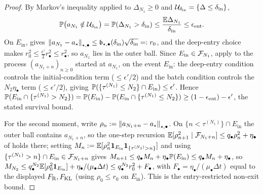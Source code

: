 \begin{proof}
By Markov's inequality applied to $\Delta_{N_1}\geq0$ and $\mathcal{U}_{\delta_{\mathrm{in}}}=\{\Delta\leq\delta_{\mathrm{in}}\}$,
\[
    \mathbb{P}\bigl(a_{N_1}\notin\mathcal{U}_{\delta_{\mathrm{in}}}\bigr)=\mathbb{P}(\Delta_{N_1}>\delta_{\mathrm{in}})
    \leq\frac{\mathbb{E}\Delta_{N_1}}{\delta_{\mathrm{in}}}\leq\epsilon_{\mathrm{ent}} .
\]
On $E_{\mathrm{in}}$,  gives
$\left\lVert a_{N_1}-a_\star\right\rVert_{\star,\bullet}\leq\mathfrak b_{\star,\bullet}(\delta_{\mathrm{in}})\sqrt{\delta_{\mathrm{in}}}=:r_0$,
and the deep-entry choice makes $r_0^2\leq\tfrac{\epsilon'}2r_\bullet^2\leq r_\bullet^2$, so
$a_{N_1}$ lies in the outer ball. Since
$E_{\mathrm{in}}\in\mathcal{F}_{N_1}$, apply  to the process
$(a_{N_1+n})_{n\geq0}$ started at $a_{N_1}$, on the event $E_{\mathrm{in}}$: the deep-entry condition
controls the initial-condition term ($\leq\epsilon'/2$) and the batch condition controls the
$N_2\eta_\bullet$ term ($\leq\epsilon'/2$), giving
$\mathbb{P}(\{\tau^{(N_1)}\leq N_2\}\cap E_{\mathrm{in}})\leq\epsilon'$. Hence
$\mathbb{P}(E_{\mathrm{in}}\cap\{\tau^{(N_1)}>N_2\})=\mathbb{P}(E_{\mathrm{in}})-\mathbb{P}(E_{\mathrm{in}}\cap\{\tau^{(N_1)}\leq N_2\})
\geq(1-\epsilon_{\mathrm{ent}})-\epsilon'$, the stated survival bound.

For the second moment, write $\rho_n:=\left\lVert a_{N_1+n}-a_\star\right\rVert_{\star,\bullet}$. On
$\{n<\tau^{(N_1)}\}\cap E_{\mathrm{in}}$ the outer ball contains $a_{N_1+n}$, so the one-step recursion
$\mathbb{E}[\rho_{n+1}^2\mid\mathcal{F}_{N_1+n}]\leq q_\bullet\rho_n^2+\eta_\bullet$ of
 holds there; setting
$M_n:=\mathbb{E}[\rho_n^2\mathbf1_{E_{\mathrm{in}}}\mathbf1_{\{\tau^{(N_1)}>n\}}]$ and using
$\{\tau^{(N_1)}>n\}\cap E_{\mathrm{in}}\in\mathcal{F}_{N_1+n}$ gives
$M_{n+1}\leq q_\bullet M_n+\eta_\bullet\mathbb{P}(E_{\mathrm{in}})\leq q_\bullet M_n+\eta_\bullet$, so
$M_{N_2}\leq q_\bullet^{N_2}\mathbb{E}[\rho_0^2\mathbf1_{E_{\mathrm{in}}}]+\eta_\bullet/(\mu_\bullet\Delta t)
\leq q_\bullet^{N_2}r_0^2+F_\bullet$, with $F_\bullet=\eta_\bullet/(\mu_\bullet\Delta t)$ equal to the
displayed $F_{\mathrm{R}},F_{\mathrm{KL}}$ (using $\rho_0\leq r_0$ on $E_{\mathrm{in}}$). This is the entry-restricted
non-exit bound.
\end{proof}

